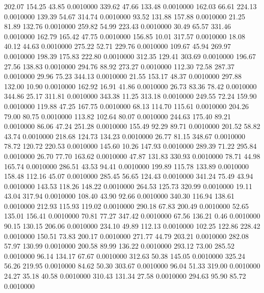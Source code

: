 202.07  154.25   43.85   0.0010000
 339.62   47.66  133.48   0.0010000
 162.03   66.61  224.13   0.0010000
 139.39   54.67  314.74   0.0010000
  93.52  131.88  157.88   0.0010000
  21.25   81.89  132.76   0.0010000
 259.82   54.99  223.43   0.0010000
  30.49   65.57  331.46   0.0010000
 162.79  165.42   47.75   0.0010000
 156.85   10.01  317.57   0.0010000
  18.08   40.12   44.63   0.0010000
 275.22   52.71  229.76   0.0010000
 109.67   45.94  269.97   0.0010000
 198.39  175.83  222.80   0.0010000
 312.35  129.41  303.69   0.0010000
 196.67   27.56  138.83   0.0010000
 294.76   88.92  273.27   0.0010000
 112.30   72.58  287.37   0.0010000
  29.96   75.23  344.13   0.0010000
  21.55  153.17   48.37   0.0010000
 297.88  132.00   10.90   0.0010000
 162.92   16.91   41.86   0.0010000
  26.73   83.36   78.42   0.0010000
 344.86   25.17  311.81   0.0010000
 343.38   11.25  313.18   0.0010000
 249.55   72.24  159.90   0.0010000
 119.88   47.25  167.75   0.0010000
  68.13  114.70  115.61   0.0010000
 204.26   79.00   80.75   0.0010000
 113.82  102.64   80.07   0.0010000
 244.63  175.40   89.21   0.0010000
  86.06   47.24  251.28   0.0010000
 155.49   92.29   89.71   0.0010000
 201.52   58.82   43.74   0.0010000
 218.68  124.73  134.23   0.0010000
  26.77   81.15  348.67   0.0010000
  78.72  120.72  220.53   0.0010000
 145.60   10.26  147.93   0.0010000
 289.39   71.22  295.84   0.0010000
  26.70   77.70  163.62   0.0010000
  47.87  131.83  330.93   0.0010000
  78.71   44.98  165.74   0.0010000
 286.51   43.53   94.41   0.0010000
 199.89  115.78  133.89   0.0010000
 158.48  112.16   45.07   0.0010000
 285.45   56.65  124.43   0.0010000
 341.24   75.49   43.94   0.0010000
 143.53  118.26  148.22   0.0010000
 264.53  125.73  320.99   0.0010000
  19.11   43.04  317.94   0.0010000
 108.40   43.90   92.66   0.0010000
 340.30  116.94  138.61   0.0010000
 212.93  115.93  119.02   0.0010000
 290.18   67.83  200.49   0.0010000
  52.65  135.01  156.41   0.0010000
  70.81   77.27  347.42   0.0010000
  67.56  136.21    0.46   0.0010000
  90.15  130.15  206.06   0.0010000
 234.10   49.89  112.13   0.0010000
 102.25  122.86  228.42   0.0010000
 150.51   73.83  200.17   0.0010000
 271.77   44.79  203.21   0.0010000
 282.08   57.97  130.99   0.0010000
 200.58   89.99  136.22   0.0010000
 293.12   73.00  285.52   0.0010000
  96.14  134.17   67.67   0.0010000
 312.63   50.38  145.05   0.0010000
 325.24   56.26  219.95   0.0010000
  84.62   50.30  303.67   0.0010000
  96.04   51.33  319.00   0.0010000
  24.27   35.18   40.58   0.0010000
 310.43  131.34   27.58   0.0010000
 294.63   95.90   85.72   0.0010000
